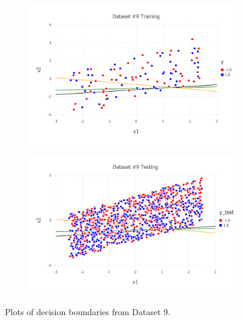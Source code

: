 \begin{figure}[h!]
\centering
    \begin{subfigure}[b]{0.45\textwidth}
	\includegraphics[scale=0.6]{figures/train_final_9.pdf}
    \end{subfigure}
    \quad
    \begin{subfigure}[b]{0.45\textwidth}
	\includegraphics[scale=0.6]{figures/test_final_9.pdf}
	\end{subfigure}
    \caption{Plots of decision boundaries from Dataset 9.}  \label{fig:dataset_9}  
\end{figure}